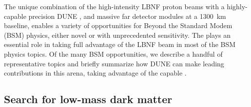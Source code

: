 {}
\label{ch:appx-ndbsm:BSMappendix}

The unique combination of the high-intensity LBNF proton beams with a highly-capable precision DUNE , and massive  far detector modules at a 1300~km baseline, enables a variety of opportunities for Beyond the Standard Modem (BSM) physics, either novel or with unprecedented sensitivity. The  plays an essential role in taking full advantage of the LBNF beam in most of the BSM physics topics.  Of the many BSM opportunities, we describe a handful of representative topics and briefly summarize how DUNE can make leading contributions in this arena, taking advantage of the capable . 

\subsection{Search for low-mass dark matter}
\label{ssec:exsum-nd-BSMappendix-dm}



